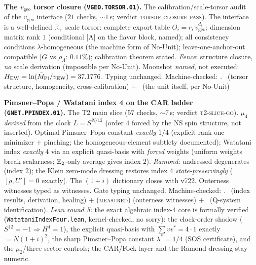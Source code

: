 
\par\smallskip\noindent\textbf{The $v_{\mathrm{geo}}$ torsor closure
(\texttt{VGEO.TORSOR.01}).}
The calibration/scale-torsor audit of the $v_{\mathrm{geo}}$
interface ($21$ checks, ${\sim}1$\,s; verdict \textsc{torsor closure
pass}).  The interface is a well-defined $\mathbb R_+$ scale torsor:
complete export table $O_i=r_i\,v_{\mathrm{geo}}^{d_i}$; dimension
matrix rank $1$ (conditional [A] on the flavor block, named); all
consistency conditions $\lambda$-homogeneous (the machine form of
No-Unit); leave-one-anchor-out compatible ($G$ vs $\rho_\Lambda$:
$0.11\%$); calibration theorem stated.  \emph{Fence}: structure
closure, \emph{no} scale derivation (impossible per No-Unit).
Moonshot \emph{named}, not executed:
$H_{\mathrm{EW}}=\ln(\bar M_{\mathrm{Pl}}/v_{\mathrm{EW}})=37.1776$.  Typing
unchanged.
Machine-checked: .
\mE\ (torsor structure, homogeneity, cross-calibration) $+$ \mO\
(the unit itself, per No-Unit)
\par\smallskip

\par\smallskip\noindent\textbf{Pimsner--Popa / Watatani index 4 on
the CAR ladder (\texttt{GNET.PPINDEX.01}).}
The T2 main slice ($57$ checks, ${\sim}7$\,s; verdict
\textsc{t2-slice-go}).  $\mu_4$ \emph{derived} from the clock
$L=S^{N/12}$ (order $4$ forced by the NS spin structure, not
inserted).  Optimal Pimsner--Popa constant \emph{exactly} $1/4$
(explicit rank-one minimizer $+$ pinching; the homogeneous-element
subtlety documented); Watatani index \emph{exactly} $4$ via an
explicit quasi-basis with \emph{forced} weights (uniform weights
break scalarness; $\mathbb{Z}_2$-only average gives index $2$).
\emph{Ramond}: undressed degenerates (index $2$); the Klein
zero-mode dressing restores index $4$ \emph{state-preservingly}
($[\rho,U']=0$ exactly).  The $(1{+}i)$ dictionary closes with
v722.  Outerness witnesses typed as witnesses.  Gate typing
unchanged.
Machine-checked: .
\mE\ (index results, derivation, healing) $+$ (\textsc{measured})
(outerness witnesses) $+$ \mO\ (Q-system identification).
\emph{Lean round 5:} the exact algebraic index-4 core is formally
verified (\texttt{WatataniIndexFour.lean}, kernel-checked, no
sorry): the clock-order shadow ($S^{12}=-1 \Rightarrow H^4=1$), the
explicit quasi-basis with $\sum v v^* = 4\cdot 1$ exactly
$= N(1{+}i)^2$, the sharp Pimsner--Popa constant $\lambda^*=1/4$
(SOS certificate), and the $\mu_2$/three-sector controls; the
CAR/Fock layer and the Ramond dressing stay numeric.
\par\smallskip

